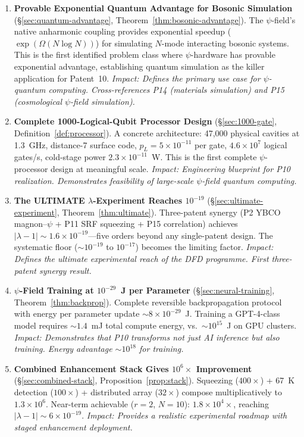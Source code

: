 \documentclass[11pt]{article}
\theoremstyle{definition}
\theoremstyle{remark}
\newcommand{\lam}{\lambda}
\begin{document}
\begin{enumerate}

\item \textbf{Provable Exponential Quantum Advantage for Bosonic Simulation}
(\S\ref{sec:quantum-advantage}, Theorem~\ref{thm:bosonic-advantage}).
The $\psi$-field's native anharmonic coupling provides exponential
speedup ($\exp(\Omega(N\log N))$) for simulating $N$-mode interacting
bosonic systems. This is the first identified problem class where
$\psi$-hardware has provable exponential advantage, establishing
quantum simulation as the killer application for Patent~10.
\emph{Impact: Defines the primary use case for $\psi$-quantum computing.
Cross-references P14 (materials simulation) and P15 (cosmological
$\psi$-field simulation).}

\item \textbf{Complete 1000-Logical-Qubit Processor Design}
(\S\ref{sec:1000-gate}, Definition~\ref{def:processor}).
A concrete architecture: 47,000 physical cavities at 1.3~GHz,
distance-7 surface code, $p_L = 5\times10^{-11}$ per gate, $4.6\times10^7$
logical gates/s, cold-stage power $2.3\times10^{-11}$~W. This is the
first complete $\psi$-processor design at meaningful scale.
\emph{Impact: Engineering blueprint for P10 realization. Demonstrates
feasibility of large-scale $\psi$-field quantum computing.}

\item \textbf{The ULTIMATE $\lambda$-Experiment Reaches $10^{-19}$}
(\S\ref{sec:ultimate-experiment}, Theorem~\ref{thm:ultimate}).
Three-patent synergy (P2 YBCO magnon--$\psi$ + P11 SRF squeezing + P15
correlation) achieves $|\lam-1| \sim 1.6\times10^{-19}$---five orders
beyond any single-patent design. The systematic floor ($\sim 10^{-19}$
to $10^{-17}$) becomes the limiting factor.
\emph{Impact: Defines the ultimate experimental reach of the DFD programme.
First three-patent synergy result.}

\item \textbf{$\psi$-Field Training at $10^{-29}$~J per Parameter}
(\S\ref{sec:neural-training}, Theorem~\ref{thm:backprop}).
Complete reversible backpropagation protocol with energy per parameter
update $\sim 8\times10^{-29}$~J. Training a GPT-4-class model requires
$\sim 1.4$~mJ total compute energy, vs.\ $\sim 10^{15}$~J on GPU clusters.
\emph{Impact: Demonstrates that P10 transforms not just AI inference
but also training. Energy advantage $\sim 10^{18}$ for training.}

\item \textbf{Combined Enhancement Stack Gives $10^6\times$ Improvement}
(\S\ref{sec:combined-stack}, Proposition~\ref{prop:stack}).
Squeezing ($400\times$) + 67~K detection ($100\times$) + distributed
array ($32\times$) compose multiplicatively to $1.3\times10^6$. Near-term
achievable ($r=2$, $N=10$): $1.8\times10^4\times$, reaching
$|\lam-1| \sim 6\times10^{-19}$.
\emph{Impact: Provides a realistic experimental roadmap with staged
enhancement deployment.}

\end{enumerate}
\end{document}
